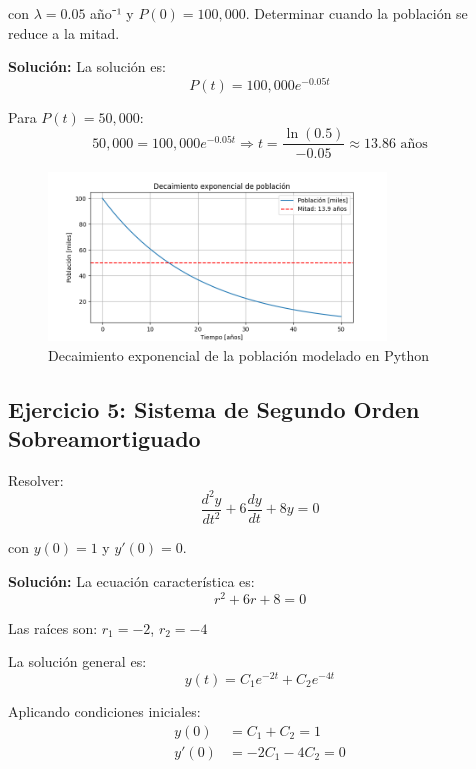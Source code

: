 \documentclass[12pt]{article}
\begin{document}
con $\lambda = 0.05$ año⁻¹ y $P(0) = 100,000$. Determinar cuando la población se reduce a la mitad.

\textbf{Solución:}
La solución es:
\begin{equation}
    P(t) = 100,000 e^{-0.05t}
\end{equation}

Para $P(t) = 50,000$:
\begin{equation}
    50,000 = 100,000 e^{-0.05t} \Rightarrow t = \frac{\ln(0.5)}{-0.05} \approx 13.86 \text{ años}
\end{equation}

\begin{figure}[H]
    \centering
    \includegraphics[width=0.8\textwidth]{imagen-ejercicio4.png}
    \caption{Decaimiento exponencial de la población modelado en Python}
\end{figure}

\subsection{Ejercicio 5: Sistema de Segundo Orden Sobreamortiguado}

Resolver:
\begin{equation}
    \frac{d^2 y}{dt^2} + 6 \frac{dy}{dt} + 8y = 0
\end{equation}

con $y(0) = 1$ y $y'(0) = 0$.

\textbf{Solución:}
La ecuación característica es:
\begin{equation}
    r^2 + 6r + 8 = 0
\end{equation}

Las raíces son: $r_1 = -2$, $r_2 = -4$

La solución general es:
\begin{equation}
    y(t) = C_1 e^{-2t} + C_2 e^{-4t}
\end{equation}

Aplicando condiciones iniciales:
\begin{align}
    y(0) &= C_1 + C_2 = 1 \\
    y'(0) &= -2C_1 - 4C_2 = 0
\end{align}
\end{document}
